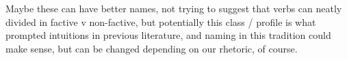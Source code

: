 \documentclass[10pt]{article}\usepackage[]{graphicx}\usepackage[]{color}
\begin{document}
Maybe these can have better names, not trying to suggest that verbs can neatly divided in factive v non-factive, but potentially this class / profile is what prompted intuitions in previous literature, and naming in this tradition could make sense, but can be changed depending on our rhetoric, of course.

% 
% 
% 
% 
% 
% 
% 
% 
% 
% 
% 
% 
\end{document}
